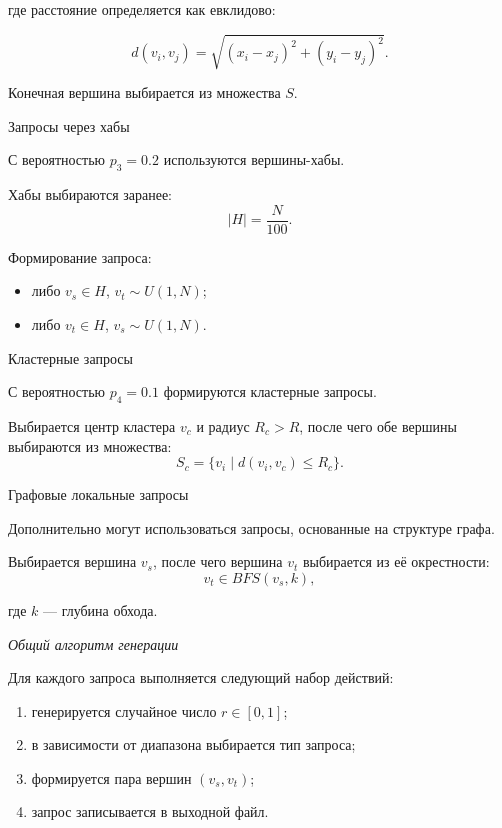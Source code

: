 где расстояние определяется как евклидово:

\begin{equation*}
    d(v_i, v_j) = \sqrt{(x_i - x_j)^2 + (y_i - y_j)^2}.
\end{equation*}

Конечная вершина выбирается из множества $S$.

Запросы через хабы

С вероятностью $p_3 = 0.2$ используются вершины-хабы.

Хабы выбираются заранее:
\begin{equation*}
    |H| = \frac{N}{100}.
\end{equation*}

Формирование запроса:
\begin{itemize}
    \item либо $v_s \in H$, $v_t \sim U(1, N)$;
    \item либо $v_t \in H$, $v_s \sim U(1, N)$.
\end{itemize}

Кластерные запросы

С вероятностью $p_4 = 0.1$ формируются кластерные запросы.

Выбирается центр кластера $v_c$ и радиус $R_c > R$, после чего обе вершины выбираются из множества:
\begin{equation*}
    S_c = \{ v_i \mid d(v_i, v_c) \le R_c \}.
\end{equation*}

Графовые локальные запросы

Дополнительно могут использоваться запросы, основанные на структуре графа.

Выбирается вершина $v_s$, после чего вершина $v_t$ выбирается из её окрестности:
\begin{equation*}
    v_t \in BFS(v_s, k),
\end{equation*}

где $k$ --- глубина обхода.

\textit{Общий алгоритм генерации}

Для каждого запроса выполняется следующий набор действий:
\begin{enumerate}
    \item генерируется случайное число $r \in [0,1]$;
    \item в зависимости от диапазона выбирается тип запроса;
    \item формируется пара вершин $(v_s, v_t)$;
    \item запрос записывается в выходной файл.
\end{enumerate}


